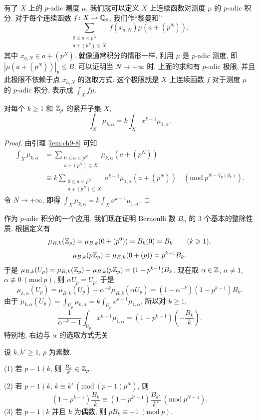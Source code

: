 有了 $X$ 上的 $p$-adic 测度 $\mu$, 我们就可以定义 $X$ 上连续函数对测度 $\mu$ 的 $p$-adic 积分. 对于每个连续函数 $f\colon X\to\mathbb{Q}_p$, 我们作``黎曼和''
\[
  \sum_{\substack{0\leqslant a<p^N\\ a+(p^N)\subseteq X}}f(x_{a,N})\mu(a+(p^N)),
\]
其中 $x_{a,N}\in a+(p^N)$. 就像通常积分的情形一样, 利用 $\mu$ 是 $p$-adic 测度, 即 $|\mu(a+(p^N))|_p\leqslant B$, 可以证明当 $N\to+\infty$ 时, 上面的求和有 $p$-adic 极限, 并且此极限不依赖于点 $x_{a,N}$ 的选取方式. 这个极限就是 $X$ 上连续函数 $f$ 对于测度 $\mu$ 的 $p$-adic 积分, 表示成 $\int_X f\mu$.

\begin{theorem}\label{thm:9.21}
对每个 $k\geqslant 1$ 和 $\mathbb{Z}_p$ 的紧开子集 $X$,
\[
  \int_X\mu_{k,\alpha}=k\int_Xx^{k-1}\mu_{1,\alpha}.
\]
\end{theorem}

\begin{proof}
由引理 \ref{lem:ch9-8} 可知
\[
  \begin{aligned}
    \int_X\mu_{k,\alpha}
    &=\sum_{\substack{0\leqslant a<p^N\\ a+(p^N)\subseteq X}}\mu_{k,\alpha}(a+(p^N))\\
    &\equiv k\sum_{\substack{0\leqslant a<p^N\\ a+(p^N)\subseteq X}}a^{k-1}\mu_{1,\alpha}(a+(p^N))
    \quad(\mathrm{mod}\ p^{N-V_p(d_k)}).
  \end{aligned}
\]
令 $N\to+\infty$, 即得 $\int_X\mu_{k,\alpha}=k\int_Xx^{k-1}\mu_{1,\alpha}$.
\end{proof}

作为 $p$-adic 积分的一个应用, 我们现在证明 Bernoulli 数 $B_n$ 的 $3$ 个基本的整除性质. 根据定义有
\[
  \mu_{B,k}(\mathbb{Z}_p)=\mu_{B,k}(0+(p^0))=B_k(0)=B_k\qquad(k\geqslant 1),
\]
\[
  \mu_{B,k}(p\mathbb{Z}_p)=\mu_{B,k}(0+(p))=p^{k-1}B_k.
\]
于是 $\mu_{B,k}(U_p)=\mu_{B,k}(\mathbb{Z}_p)-\mu_{B,k}(p\mathbb{Z}_p)=(1-p^{k-1})B_k$. 现在取 $\alpha\in\mathbb{Z}$, $\alpha\neq 1$, $\alpha\not\equiv 0\ (\mathrm{mod}\ p)$, 则 $\alpha U_p=U_p$. 于是
\[
  \mu_{k,\alpha}(U_p)=\mu_{B,k}(U_p)-\alpha^{-k}\mu_{B,k}(\alpha U_p)
  =(1-\alpha^{-k})(1-p^{k-1})B_k.
\]
由于 $\mu_{k,\alpha}(U_p)=\int_{U_p}\mu_{k,\alpha}=k\int_{U_p}x^{k-1}\mu_{1,\alpha}$, 所以对 $k\geqslant 1$,
\begin{equation}\tag{10}
  \frac{1}{\alpha^{-k}-1}\int_{U_p}x^{k-1}\mu_{1,\alpha}
  =(1-p^{k-1})\left(-\frac{B_k}{k}\right).
\end{equation}
特别地, 右边与 $\alpha$ 的选取方式无关.

\begin{theorem}\label{thm:9.22}
设 $k,k'\geqslant 1$, $p$ 为素数.

(1) 若 $p-1\nmid k$, 则 $\frac{B_k}{k}\in\mathbb{Z}_p$.

(2) 若 $p-1\nmid k$, $k\equiv k'\ (\mathrm{mod}\ (p-1)p^N)$, 则
\[
  (1-p^{k-1})\frac{B_k}{k}
  \equiv(1-p^{k'-1})\frac{B_{k'}}{k'}\ (\mathrm{mod}\ p^{N+1}).
\]
(3) 若 $p-1\mid k$ 并且 $k$ 为偶数, 则 $pB_k\equiv -1\ (\mathrm{mod}\ p)$.
\end{theorem}

